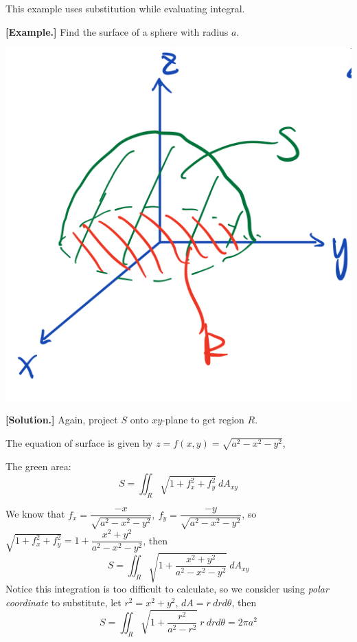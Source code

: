 \documentclass[11pt, a4paper]{MATH2023}
\newcommand{\eg}{\textbf{[Example.] }}
\newcommand{\sol}{\textbf{[Solution.] }}
\begin{document}
\begin{spacing}{1.3}
    \newpage
    {\blue This example uses substitution while evaluating integral.}

    \eg Find the surface of a sphere with radius $a$.
    \begin{center}
        \includegraphics[scale=0.25]{images/Ch14-surface-area-eg4.jpeg}
    \end{center}

    \sol Again, project $S$ onto $xy$-plane to get region $R$.

    The equation of surface is given by $z=f(x,y)=\sqrt{a^2-x^2-y^2}$,
    
    The green area: $$S=\iint_R\sqrt{1+f_x^2+f_y^2}\ dA_{xy}$$

    We know that $f_x=\dfrac{-x}{\sqrt{a^2-x^2-y^2}},\ f_y=\dfrac{-y}{\sqrt{a^2-x^2-y^2}}$, so 
    $\sqrt{1+f_x^2+f_y^2}=1+\dfrac{x^2+y^2}{a^2-x^2-y^2}$, then
    $$S = \iint_R \sqrt{1+\dfrac{x^2+y^2}{a^2-x^2-y^2}}\ dA_{xy}$$
    Notice this integration is too difficult to calculate, so we consider using {\it polar coordinate}
    to substitute, let $r^2=x^2+y^2$, $dA=r\ drd\theta$, then 
    $$S = \iint_R \sqrt{1+\dfrac{r^2}{a^2-r^2}}\ r\ drd\theta=2\pi a^2$$

\end{spacing}
\end{document}
